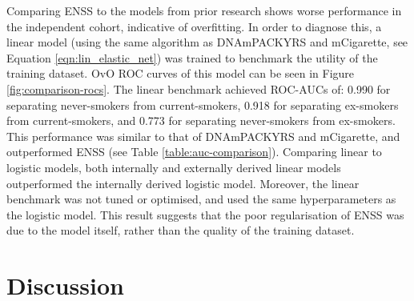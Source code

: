 \documentclass[draft]{article} %
\begin{document}
Comparing ENSS to the models from prior research shows worse performance in the independent cohort, indicative of overfitting. In order to diagnose this, a linear model (using the same algorithm as DNAmPACKYRS and mCigarette, see Equation \ref{eqn:lin_elastic_net}) was trained to benchmark the utility of the training dataset. OvO ROC curves of this model can be seen in Figure \ref{fig:comparison-rocs}. The linear benchmark achieved ROC-AUCs of: 0.990 for separating never-smokers from current-smokers, 0.918 for separating ex-smokers from current-smokers, and 0.773 for separating never-smokers from ex-smokers. This performance was similar to that of DNAmPACKYRS and mCigarette, and outperformed ENSS (see Table \ref{table:auc-comparison}). Comparing linear to logistic models, both internally and externally derived linear models outperformed the internally derived logistic model. Moreover, the linear benchmark was not tuned or optimised, and used the same hyperparameters as the logistic model. This result suggests that the poor regularisation of ENSS was due to the model itself, rather than the quality of the training dataset.

\newpage
\section{Discussion}
\end{document}
